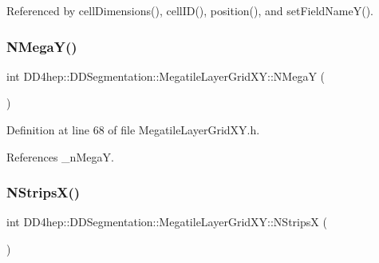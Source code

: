Referenced by cell\+Dimensions(), cell\+I\+D(), position(), and set\+Field\+Name\+Y().

\hypertarget{class_d_d4hep_1_1_d_d_segmentation_1_1_megatile_layer_grid_x_y_ac5c3cbce77f0b432cc597689fab38c59}{}\label{class_d_d4hep_1_1_d_d_segmentation_1_1_megatile_layer_grid_x_y_ac5c3cbce77f0b432cc597689fab38c59} 
\subsubsection{\texorpdfstring{N\+Mega\+Y()}{NMegaY()}}
{\footnotesize\ttfamily int D\+D4hep\+::\+D\+D\+Segmentation\+::\+Megatile\+Layer\+Grid\+X\+Y\+::\+N\+MegaY (\begin{DoxyParamCaption}{ }\end{DoxyParamCaption})\hspace{0.3cm}{\ttfamily [inline]}}



Definition at line 68 of file Megatile\+Layer\+Grid\+X\+Y.\+h.



References \+\_\+n\+MegaY.

\hypertarget{class_d_d4hep_1_1_d_d_segmentation_1_1_megatile_layer_grid_x_y_a6004cfbffa52b347d04d12a0bd0657c0}{}\label{class_d_d4hep_1_1_d_d_segmentation_1_1_megatile_layer_grid_x_y_a6004cfbffa52b347d04d12a0bd0657c0} 
\subsubsection{\texorpdfstring{N\+Strips\+X()}{NStripsX()}}
{\footnotesize\ttfamily int D\+D4hep\+::\+D\+D\+Segmentation\+::\+Megatile\+Layer\+Grid\+X\+Y\+::\+N\+StripsX (\begin{DoxyParamCaption}{ }\end{DoxyParamCaption})\hspace{0.3cm}{\ttfamily [inline]}}



